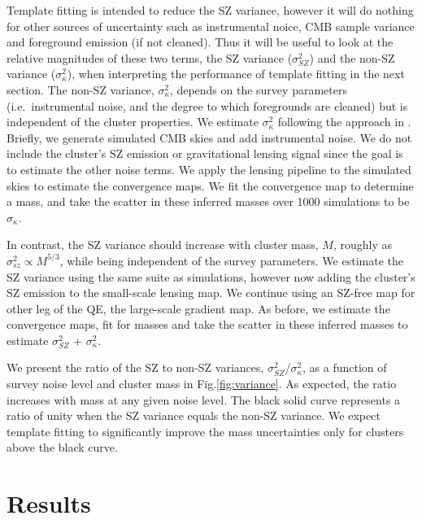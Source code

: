 Template fitting is intended to reduce the SZ variance, however it will do nothing for other sources of uncertainty such as instrumental noice, CMB sample variance and foreground emission (if not cleaned). 
Thus it will be useful to look at the relative magnitudes of these two terms, the SZ variance ($\sigma_{SZ}^{2}$) and the non-SZ variance ($\sigma_{\kappa}^{2}$), when interpreting the performance of template fitting in the next section.
The non-SZ variance, $\sigma_{\kappa}^{2}$, depends on the survey parameters (i.e.~instrumental noise, and the degree to which foregrounds are cleaned) but is independent of the cluster properties. 
We estimate $\sigma_{\kappa}^{2}$ following the approach in \citet{raghunathan18}. 
Briefly, we generate simulated CMB skies and add instrumental noise. 
We do not include the cluster's SZ emission or gravitational lensing signal since the goal is to estimate the other noise terms. 
We apply the lensing pipeline to the simulated skies to estimate the convergence maps. 
We fit the convergence map  to determine  a mass, and take the scatter in these inferred masses over 1000 simulations to be $\sigma_{\kappa}$. 

In contrast, the SZ variance should increase with cluster mass, $M$, roughly as $\sigma_{sz}^2 \propto M^{5/3}$, while being independent of the survey parameters. 
We estimate the SZ variance using the same suite as simulations, however now adding the cluster's SZ emission to the small-scale lensing map. 
We continue using an SZ-free map for other leg of the QE, the large-scale gradient map. 
As before, we estimate the convergence maps, fit for masses and take the scatter in these inferred masses to estimate $\sigma_{SZ}^{2}$ + $\sigma_{\kappa}^{2}$.

We present the ratio of the SZ to non-SZ variances, $\sigma_{SZ}^{2}$/$\sigma_{\kappa}^{2}$, as a function of survey noise level and cluster mass in Fig.\ref{fig:variance}.  
As expected, the ratio increases with mass at any given noise level. 
The black solid curve represents a ratio of unity when the SZ variance equals the non-SZ variance. 
We expect template fitting to significantly improve the mass uncertainties only for clusters above the black curve. 

\section{Results}
\label{sec_results}

